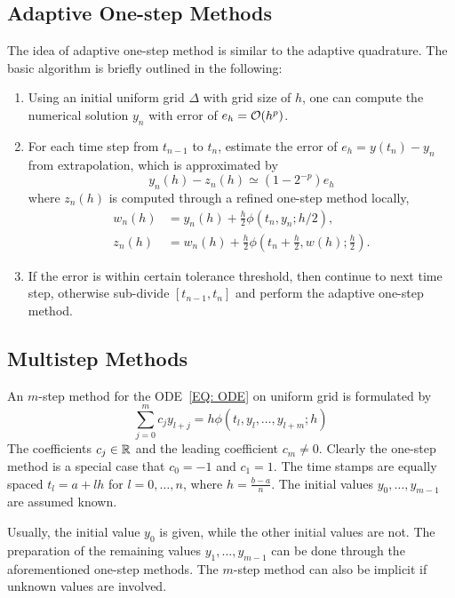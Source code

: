\subsection{Adaptive One-step Methods}
The idea of adaptive one-step method is similar to the adaptive quadrature. The basic algorithm is briefly outlined in the following:
\begin{enumerate}
    \item Using an initial uniform grid $\Delta$ with grid size of $h$, one can compute the numerical solution $y_n$ with error of $e_h = \mathcal O(h^p)$.
    \item For each time step from $t_{n-1}$ to $t_n$, estimate the error of $e_h = y(t_n) - y_n$ from extrapolation, which is approximated by 
    $$y_n(h) - z_n(h)\simeq (1 - 2^{-p})e_h$$
    where $z_n(h)$ is computed through a refined one-step method locally,
    \begin{equation}
        \begin{aligned}
            w_n(h) &= y_n(h) + \frac{h}{2} \phi(t_n, y_n; h/2), \\ 
            z_n(h)&=w_n(h) + \frac{h}{2}\phi(t_n+\frac{h}{2}, w(h); \frac{h}{2}).
        \end{aligned}
    \end{equation}
    \item If the error is within certain tolerance threshold, then continue to next time step, otherwise sub-divide $[t_{n-1}, t_n]$ and perform the adaptive one-step method.
\end{enumerate}

\subsection{Multistep Methods}
An $m$-step method for the ODE~\eqref{EQ: ODE} on uniform grid is formulated by 
\begin{equation}
    \sum_{j=0}^m c_j y_{l + j} = h \phi(t_l, y_l, \dots, y_{l+m}; h)
\end{equation}
 The coefficients $c_j\in\mathbb R$ and the leading coefficient $c_m\neq 0$. Clearly the one-step method is a special case that $c_0 = -1$ and $c_1 = 1$. The time stamps are equally spaced $t_l = a + l h$ for $l = 0, \dots, n$, where $h = \frac{b-a}{n}$. The initial values $y_0,\dots, y_{m-1}$ are assumed known.

 \begin{remark}
     Usually, the initial value $y_0$ is given, while the other initial values are not. The preparation of the remaining values $y_1,\dots, y_{m-1}$ can be done through the aforementioned one-step methods. The $m$-step method can also be implicit if unknown values are involved.
 \end{remark}

